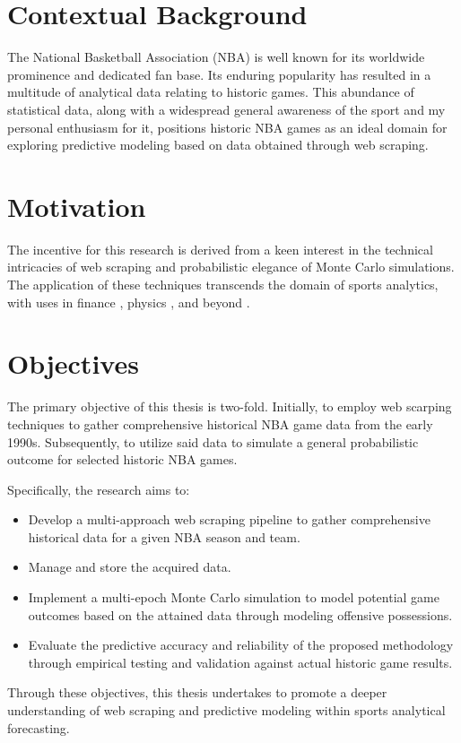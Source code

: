 \documentclass{thesis-ekf}
\theoremstyle{definition}
\theoremstyle{remark}
\begin{document}
\section{Contextual Background}
The National Basketball Association (NBA) \cite{NBA} is well known for its worldwide prominence and dedicated fan base. Its enduring popularity has resulted in a multitude of analytical data relating to historic games. This abundance of statistical data, along with a widespread general awareness of the sport and my personal enthusiasm for it, positions historic NBA games as an ideal domain for exploring predictive modeling based on data obtained through web scraping.

\section{Motivation}
The incentive for this research is derived from a keen interest in the technical intricacies of web scraping and probabilistic elegance of Monte Carlo simulations. The application of these techniques transcends the domain of sports analytics, with uses in finance \cite{McLeish}, physics \cite{Aderibigbe}, and beyond \cite{Steffen}.

\section{Objectives}
The primary objective of this thesis is two-fold. Initially, to employ web scarping techniques to gather comprehensive historical NBA game data from the early 1990s. Subsequently, to utilize said data to simulate a general probabilistic outcome for selected historic NBA games.

Specifically, the research aims to:
\begin{itemize}
\item Develop a multi-approach web scraping pipeline to gather comprehensive historical data for a given NBA season and team.
\item Manage and store the acquired data.
\item Implement a multi-epoch Monte Carlo simulation to model potential game outcomes based on the attained data through modeling offensive possessions.
\item Evaluate the predictive accuracy and reliability of the proposed methodology through empirical testing and validation against actual historic game results.
\end{itemize}
Through these objectives, this thesis undertakes to promote a deeper understanding of web scraping and predictive modeling within sports analytical forecasting.
\end{document}
